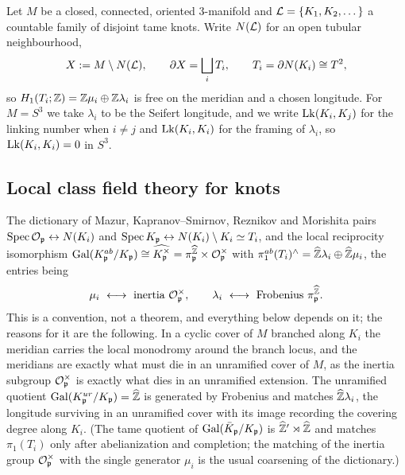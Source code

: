 Let $M$ be a closed, connected, oriented $3$-manifold and $\mathcal{L}=\{K_1,K_2,\dots\}$ a countable
family of disjoint tame knots. Write $N(\mathcal{L})$ for an open tubular neighbourhood,
\[
X:=M\setminus N(\mathcal{L}),\qquad \partial X=\bigsqcup_iT_i,\qquad T_i=\partial N(K_i)\cong T^2,
\]
so $H_1(T_i;\mathbb{Z})=\mathbb{Z}\mu_i\oplus\mathbb{Z}\lambda_i$ is free on the meridian and a chosen longitude.
For $M=S^3$ we take $\lambda_i$ to be the Seifert longitude, and we write $\operatorname{Lk}(K_i,K_j)$ for
the linking number when $i\ne j$ and $\operatorname{Lk}(K_i,K_i)$ for the framing of $\lambda_i$, so
$\operatorname{Lk}(K_i,K_i)=0$ in $S^3$.

\subsection{Local class field theory for knots}

\begin{definition}\label{VIII:lem:localcft}
The dictionary of Mazur, Kapranov--Smirnov, Reznikov and Morishita
\cite{Mazur,Kapranov,Reznikov,Morishita} pairs $\operatorname{Spec}\mathcal{O}_{\mathfrak{p}}\leftrightarrow N(K_i)$ and
$\operatorname{Spec} K_{\mathfrak{p}}\leftrightarrow N(K_i)\setminus K_i\simeq T_i$, and the local reciprocity
isomorphism $\operatorname{Gal}(K_{\mathfrak{p}}^{ab}/K_{\mathfrak{p}})\cong\widehat{K_{\mathfrak{p}}^\times}=\pi_{\mathfrak{p}}^{\widehat{\mathbb{Z}}}\times\mathcal{O}_{\mathfrak{p}}^\times$
\cite[Ch.~V]{Neukirch} with $\pi_1^{ab}(T_i)^\wedge=\widehat{\mathbb{Z}}\lambda_i\oplus\widehat{\mathbb{Z}}\mu_i$, the entries
being
\begin{equation}\label{VIII:eq:localdict}
\mu_i\ \longleftrightarrow\ \text{inertia }\mathcal{O}_{\mathfrak{p}}^\times,
\qquad
\lambda_i\ \longleftrightarrow\ \text{Frobenius }\pi_{\mathfrak{p}}^{\widehat{\mathbb{Z}}}.
\end{equation}
This is a convention, not a theorem, and everything below depends on it; the reasons for it
are the following. In a cyclic cover of $M$ branched along $K_i$ the meridian carries the
local monodromy around the branch locus, and the meridians are exactly what must die in an
unramified cover of $M$, as the inertia subgroup $\mathcal{O}_{\mathfrak{p}}^\times$ is exactly what dies in an
unramified extension. The unramified quotient $\operatorname{Gal}(K_{\mathfrak{p}}^{ur}/K_{\mathfrak{p}})=\widehat{\mathbb{Z}}$ is generated by
Frobenius and matches $\widehat{\mathbb{Z}}\lambda_i$, the longitude surviving in an unramified cover with its
image recording the covering degree along $K_i$. (The tame quotient of $\operatorname{Gal}(\bar K_{\mathfrak{p}}/K_{\mathfrak{p}})$
is $\widehat{\mathbb{Z}}'\rtimes\widehat{\mathbb{Z}}$ and matches $\pi_1(T_i)$ only after abelianization and completion; the
matching of the inertia group $\mathcal{O}_{\mathfrak{p}}^\times$ with the single generator $\mu_i$ is the
usual coarsening of the dictionary.)
\end{definition}

